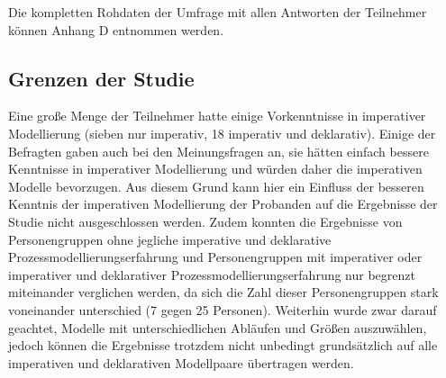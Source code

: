 Die kompletten Rohdaten der Umfrage mit allen Antworten der Teilnehmer können Anhang D entnommen werden.

\subsection{Grenzen der Studie}

Eine große Menge der Teilnehmer hatte einige Vorkenntnisse in imperativer Modellierung (sieben nur imperativ, 18 imperativ und deklarativ). Einige der Befragten gaben auch bei den Meinungsfragen an, sie hätten einfach bessere Kenntnisse in imperativer Modellierung und würden daher die imperativen Modelle bevorzugen. Aus diesem Grund kann hier ein Einfluss der besseren Kenntnis der imperativen Modellierung der Probanden auf die Ergebnisse der Studie nicht ausgeschlossen werden. \newline 
Zudem konnten die Ergebnisse von Personengruppen ohne jegliche imperative und deklarative Prozessmodellierungserfahrung und Personengruppen mit imperativer oder imperativer und deklarativer Prozessmodellierungserfahrung nur begrenzt miteinander verglichen werden, da sich die Zahl dieser Personengruppen stark voneinander unterschied (7 gegen 25 Personen).\newline
Weiterhin wurde zwar darauf geachtet, Modelle mit unterschiedlichen Abläufen und Größen auszuwählen, jedoch können die Ergebnisse trotzdem nicht unbedingt grundsätzlich auf alle imperativen und deklarativen Modellpaare übertragen werden. \newline

 












